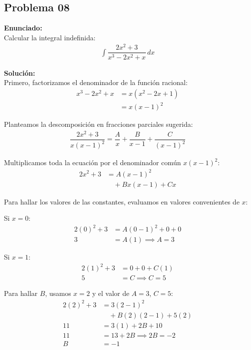 \subsection*{Problema 08}

\textbf{Enunciado:} \\
Calcular la integral indefinida:
\begin{align*}
\int \dfrac{2x^2 + 3}{x^3 - 2x^2 + x} \, dx
\end{align*}

\textbf{Solución:} \\
Primero, factorizamos el denominador de la función racional:
\begin{align*}
x^3 - 2x^2 + x &= x(x^2 - 2x + 1) \\
&= x(x - 1)^2
\end{align*}

Planteamos la descomposición en fracciones parciales sugerida:
\begin{align*}
\dfrac{2x^2 + 3}{x(x - 1)^2} = \dfrac{A}{x} + \dfrac{B}{x - 1} + \dfrac{C}{(x - 1)^2}
\end{align*}

Multiplicamos toda la ecuación por el denominador común $x(x - 1)^2$:
\begin{align*}
2x^2 + 3 &= A(x - 1)^2 \\
&\quad + Bx(x - 1) + Cx
\end{align*}

Para hallar los valores de las constantes, evaluamos en valores convenientes de $x$:

Si $x = 0$:
\begin{align*}
2(0)^2 + 3 &= A(0 - 1)^2 + 0 + 0 \\
3 &= A(1) \implies A = 3
\end{align*}

Si $x = 1$:
\begin{align*}
2(1)^2 + 3 &= 0 + 0 + C(1) \\
5 &= C \implies C = 5
\end{align*}

Para hallar $B$, usamos $x = 2$ y el valor de $A = 3$, $C = 5$:
\begin{align*}
2(2)^2 + 3 &= 3(2 - 1)^2 \\
&\quad + B(2)(2 - 1) + 5(2) \\
11 &= 3(1) + 2B + 10 \\
11 &= 13 + 2B \implies 2B = -2 \\
B &= -1
\end{align*}

